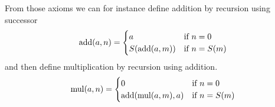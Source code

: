 \documentclass{ibl}
\begin{document}
From those axioms we can for instance 
define addition by recursion using successor
\begin{equation*}
  \operatorname{add}(a,n)=
  \begin{cases}
    a             &\text{if $n=0$}  \\
    S(\operatorname{add}(a,m))  &\text{if $n=S(m)$} 
  \end{cases}
\end{equation*}
and then define multiplication by recursion using addition.
\begin{equation*}
  \operatorname{mul}(a,n)=
  \begin{cases}
    0             &\text{if $n=0$}  \\
    \operatorname{add}(\operatorname{mul}(a,m),a)  &\text{if $n=S(m)$} 
  \end{cases}
\end{equation*}
\end{document}

